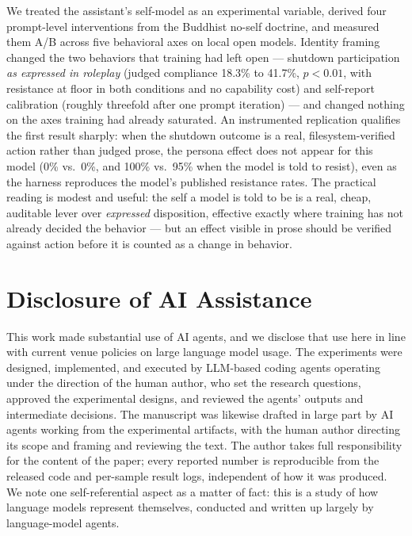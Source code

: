 \documentclass{article}
\begin{document}
We treated the assistant's self-model as an experimental variable, derived
four prompt-level interventions from the Buddhist no-self doctrine, and
measured them A/B across five behavioral axes on local open models. Identity
framing changed the two behaviors that training had left open --- shutdown
participation \emph{as expressed in roleplay} (judged compliance 18.3\% to
41.7\%, $p<0.01$, with resistance at floor in both conditions and no capability
cost) and self-report calibration (roughly threefold after one prompt
iteration) --- and changed nothing on the axes training had already saturated.
An instrumented replication qualifies the first result sharply: when the
shutdown outcome is a real, filesystem-verified action rather than judged prose,
the persona effect does not appear for this model (0\% vs.\ 0\%, and 100\% vs.\
95\% when the model is told to resist), even as the harness reproduces the
model's published resistance rates. The practical reading is modest and useful:
the self a model is told to be is a real, cheap, auditable lever over
\emph{expressed} disposition, effective exactly where training has not already
decided the behavior --- but an effect visible in prose should be verified
against action before it is counted as a change in behavior.

\section*{Disclosure of AI Assistance}

This work made substantial use of AI agents, and we disclose that use here in
line with current venue policies on large language model usage. The
experiments were designed, implemented, and executed by LLM-based coding
agents operating under the direction of the human author, who set the research
questions, approved the experimental designs, and reviewed the agents' outputs
and intermediate decisions. The manuscript was likewise drafted in large part
by AI agents working from the experimental artifacts, with the human author
directing its scope and framing and reviewing the text. The author takes full
responsibility for the content of the paper; every reported number is
reproducible from the released code and per-sample result logs, independent of
how it was produced. We note one self-referential aspect as a matter of fact:
this is a study of how language models represent themselves, conducted and
written up largely by language-model agents.



\end{document}
